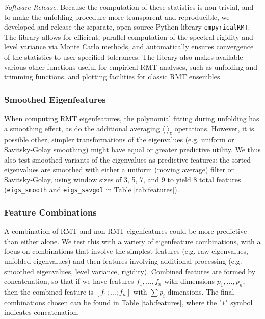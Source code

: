 \documentclass[12pt]{spieman}  %
\newcommand{\code}[1]{\small\texttt{#1}\normalsize}
\begin{document}
\begin{spacing}{2}
\textit{Software Release}. Because the computation of these statistics is non-trivial, and to make the
unfolding procedure more transparent and reproducible, we developed and release
the separate, open-source Python library
\code{empyricalRMT}\cite{dm-bergerStfxecutablesEmpyricalRMTV12022}. The library
allows for efficient, parallel computation of the spectral rigidity and level
variance via Monte Carlo methods, and automatically ensures convergence of the
statistics to user-specified tolerances. The library also makes available
various other functions useful for empirical RMT analyses, such as unfolding
and trimming functions, and plotting facilities for classic RMT ensembles.

\subsubsection{Smoothed Eigenfeatures}
\label{sec:eigs-only}

When computing RMT eigenfeatures, the polynomial fitting during unfolding has a
smoothing effect, as do the additional averaging \(\langle\;\rangle_c\)
operations. However, it is possible other, simpler transformations of the
eigenvalues (e.g. uniform or Savitsky-Golay smoothing) might have equal or
greater predictive utility. We thus also test smoothed variants of the
eigenvalues as predictive features: the sorted eigenvalues are smoothed with
either a uniform (moving average) filter or Savitsky-Golay, using window sizes
of 3, 5, 7, and 9 to yield 8 total features (\code{eigs\_smooth} and
\code{eigs\_savgol} in Table \ref{tab:features}).

\subsubsection{Feature Combinations}

A combination of RMT and non-RMT eigenfeatures could be more predictive than
either alone. We test this with a variety of eigenfeature combinations, with a
focus on combinations that involve the simplest features (e.g. raw eigenvalues,
unfolded eigenvalues) and then features involving additional processing (e.g.
smoothed eigenvalues, level variance, rigidity). Combined features are formed
by concatenation, so that if we have features \(f_1, \dots,  f_n\) with
dimensions \(p_1, \dots, p_n\), then the combined feature is \([f_1; \dots;
f_n]\) with \(\sum p_i\) dimensions.  The final combinations chosen can be
found in Table \ref{tab:features}, where the "\code{+}" symbol indicates concatenation.



\end{spacing}
\end{document}
